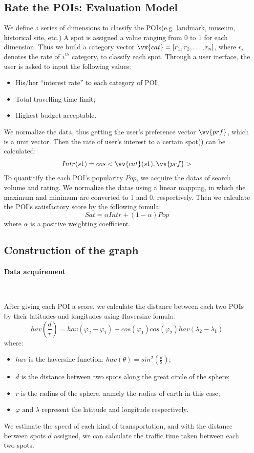 \documentclass{mcmthesis}
\begin{document}
\subsection{Rate the POIs: Evaluation Model}
  We define a series of dimensions to classify the POIs(e.g. landmark, museum, historical site, etc.) A spot is assigned a value ranging from 0 to 1 for each dimension. Thus we build a category vector $\vv{cat} = [r_{1}, r_{2}, \ldots, r_{n}]$, where $r_{i}$ denotes the rate of $i^{th}$ category, to classify each spot. Through a user inerface, the user is asked to input the following values:
  \begin{itemize}
    \item His/her ``interest rate'' to each category of POI;
    \item Total travelling time limit;
    \item Highest budget acceptable.
  \end{itemize}
  We normalize the data, thus getting the user's preference vector $\vv{prf}$, which is a unit vector. Then the rate of user's interest to a certain spot() can be calculated: 
  \[
    Intr(s1) = cos<\vv{cat}(s1),\vv{prf}>
  \]
  To quantitify the each POI's popularity $Pop$, we acquire the datas of search volume and rating. We normalize the datas using a linear mapping, in which the maximum and minimum are converted to 1 and 0, respectively. Then we calculate the POI's satisfactory score by the following fomula:
  \[
    Sat = \alpha Intr + (1-\alpha)Pop
  \]
  where $\alpha$ is a positive weighting coefficient.

\subsection{Construction of the graph}
  \paragraph{Data acquirement} \

  After giving each POI a score, we calculate the distance between each two POIs by their latitudes and longitudes using Haversine fomula:
  \[
    hav(\frac{d}{r}) = hav(\varphi_{2}-\varphi_{1}) + cos(\varphi_{1})cos(\varphi_{2})hav(\lambda_{2}-\lambda_{1})
  \]
  where:
  \begin{itemize}
    \item $hav$ is the haversine function: $hav(\theta) = sin^{2}(\frac{\theta}{2})$;
    \item $d$ is the distance between two spots along the great circle of the sphere;
    \item $r$ is the radius of the sphere, namely the radius of earth in this case;
    \item $\varphi$ and $\lambda$ represent the latitude and longitude respectively.
  \end{itemize} 
  We estimate the speed of each kind of transportation, and with the distance between spots $d$ assigned, we can calculate the traffic time taken between each two spots. \par
\end{document}
